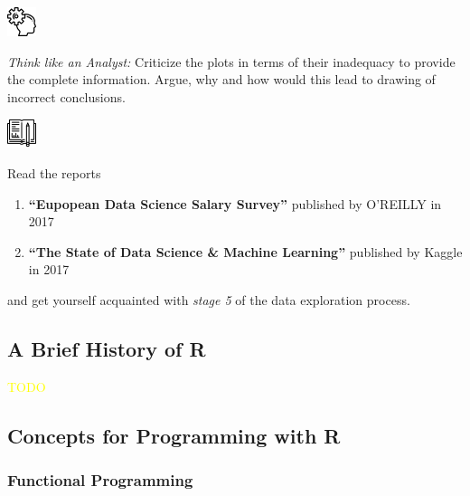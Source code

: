 \begin{minipage}[ht]{0.2\linewidth}
    \includegraphics[width=2\baselineskip]{./viz/icons/Think.png}  
\end{minipage}%
\begin{minipage}[ht]{0.75\linewidth}
\emph{Think like an Analyst:} Criticize the plots in terms of their inadequacy to provide the complete information. Argue, why and how would this lead to drawing of incorrect conclusions. 
\end{minipage}

\begin{minipage}[ht]{0.2\linewidth}
    \includegraphics[width=2\baselineskip]{./viz/icons/Homework.png}  
\end{minipage}%
\begin{minipage}[ht]{0.75\linewidth}
Read the reports
\begin{enumerate}
  \item \textbf{``Eupopean Data Science Salary Survey''} published by O'REILLY in 2017
  \item \textbf{``The State of Data Science \& Machine Learning''} published by Kaggle in 2017
\end{enumerate}
and get yourself acquainted with \emph{stage 5} of the data exploration process.
\end{minipage}

\subsection{A Brief History of R}
\textcolor{yellow}{TODO}
\subsection{Concepts for Programming with R}
\subsubsection{Functional Programming}
\begin{mdframed}[backgroundcolor=cyan!10]
\par{}
\end{mdframed}

